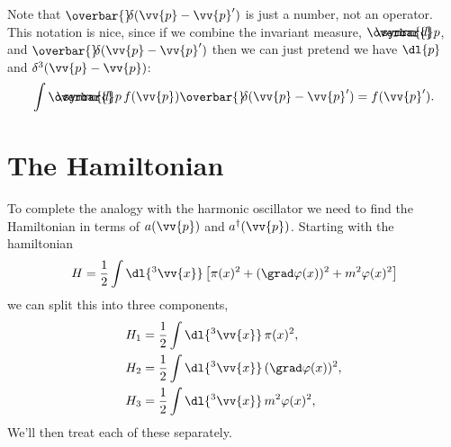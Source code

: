 \documentclass[fleqn]{NotesClass}
\newcommand{\hermit}{{\dagger}}
\newcommand\dbar{\ThisStyle{\ensurestackMath{%
            \stackengine{-.3\LMpt}{\SavedStyle \symrm{d}}{\SavedStyle\overbar{}%
                \mkern2.25mu}{O}{r}{F}{F}{L}}}}
\newcommand{\invariantmeasure}[1]{\dbar #1}
\newcommand\bardelta{\ThisStyle{\ensurestackMath{%
            \stackengine{-.3\LMpt}{\SavedStyle \delta}{\SavedStyle\overbar{}%
                \mkern4.5mu}{O}{r}{F}{F}{L}}}}
\begin{document}
    Note that \(\bardelta(\vv{p} - \vv{p}')\) is just a number, not an operator.
    This notation is nice, since if we combine the invariant measure, \(\invariantmeasure{p}\), and \(\bardelta(\vv{p} - \vv{p}')\) then we can just pretend we have \(\dl{p}\) and \(\delta^3(\vv{p} - \vv{p})\):
    \begin{equation}
        \int \invariantmeasure{p} \, f(\vv{p}) \bardelta(\vv{p} - \vv{p}') = f(\vv{p}').
    \end{equation}
    
    \section{The Hamiltonian}\label{sec:the hamiltonian}
    To complete the analogy with the harmonic oscillator we need to find the Hamiltonian in terms of \(a(\vv{p})\) and \(a^\hermit(\vv{p})\).
    Starting with the hamiltonian
    \begin{equation}
        H = \frac{1}{2} \int \dl{^3\vv{x}} \left[ \pi(x)^2 + (\grad \varphi(x))^2 + m^2 \varphi(x)^2 \right]
    \end{equation}
    we can split this into three components,
    \begin{align}
        H_1 &= \frac{1}{2}\int \dl{^3\vv{x}} \, \pi(x)^2,\\
        H_2 &= \frac{1}{2}\int \dl{^3\vv{x}} \, (\grad\varphi(x))^2,\\
        H_3 &= \frac{1}{2}\int \dl{^3\vv{x}} \, m^2\varphi(x)^2,\\
    \end{align}
    We'll then treat each of these separately.
    
\end{document}
